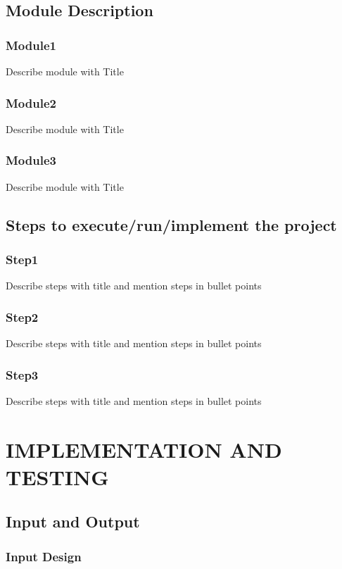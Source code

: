 \documentclass[10pt]{report}
\begin{document}
\section{Module Description}
\subsection{Module1}
Describe module with Title

\subsection{Module2}
Describe module with Title

\subsection{Module3}
Describe module with Title

\section{Steps to execute/run/implement the project}
\subsection{Step1}
Describe steps with title and mention steps in bullet points

\subsection{Step2}
Describe steps with title and mention steps in bullet points

\subsection{Step3}
Describe steps with title and mention steps in bullet points




\chapter{IMPLEMENTATION AND TESTING}
\linespread{1.5}
\section{Input and Output}
\subsection{Input Design}
\end{document}
